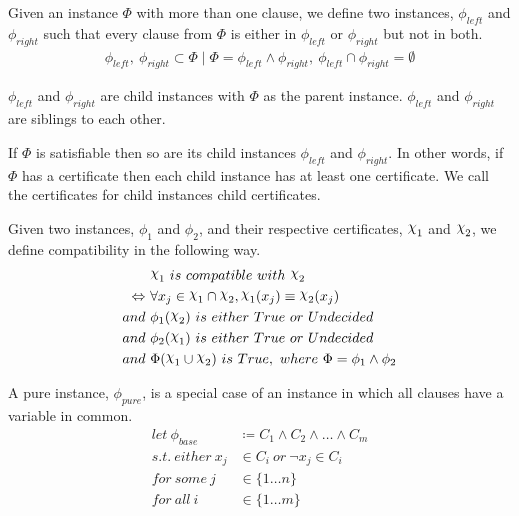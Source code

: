 \begin{definition}
\label{def:child-instances}
    Given an instance $\Phi$ with more than one clause, we define two instances, $\phi_{left}$ and $\phi_{right}$ such that every clause from $\Phi$ is either in $\phi_{left}$ or $\phi_{right}$ but not in both.
    \begin{align*}
        \phi_{left},~ \phi_{right} \subset \Phi
        \mid \Phi = \phi_{left} \land \phi_{right},~
        \phi_{left} \cap \phi_{right} = \emptyset
    \end{align*}

    $\phi_{left}$ and $\phi_{right}$ are child instances with $\Phi$ as the parent instance.
    $\phi_{left}$ and $\phi_{right}$ are siblings to each other.
\end{definition}

\begin{definition}
\label{def:child-certificates}
    If $\Phi$ is satisfiable then so are its child instances $\phi_{left}$ and $\phi_{right}$.
    In other words, if $\Phi$ has a certificate then each child instance has at least one certificate.
    We call the certificates for child instances child certificates.
\end{definition}

\begin{definition}[Compatibility]
\label{def:compatibility}
    Given two instances, $\phi_1$ and $\phi_2$, and their respective certificates, $\rchi_1$ and $\rchi_2$, we define compatibility in the following way.
    \begin{align*}
        & \rchi_1~ is~ compatible~ with~ \rchi_2 \\
        \Leftrightarrow~ & \forall x_j \in \rchi_1 \cap \rchi_2, \rchi_1(x_j) \equiv \rchi_2(x_j) \\
        and~ & \phi_1(\rchi_2)~ is~ either~ True~ or~ Undecided \\
        and~ & \phi_2(\rchi_1)~ is~ either~ True~ or~ Undecided \\
        and~ & \Phi(\rchi_1 \cup \rchi_2)~ is~ True,~ where~ \Phi = \phi_1 \land \phi_2
    \end{align*}
\end{definition}

\begin{definition}
    \label{def:pure-instance}
    A pure instance, $\phi_{pure}$, is a special case of an instance in which all clauses have a variable in common.
    \begin{align*}
        let~ \phi_{base} & \coloneqq C_1 \land C_2 \land \ldots \land C_m \\
        s.t.~ either~ x_j & \in C_i~ or~ \lnot x_j \in C_i \\
        for~ some~ j & \in \{ 1 \dots n \} \\
        for~ all~ i & \in \{ 1 \dots m \}
    \end{align*}
\end{definition}

